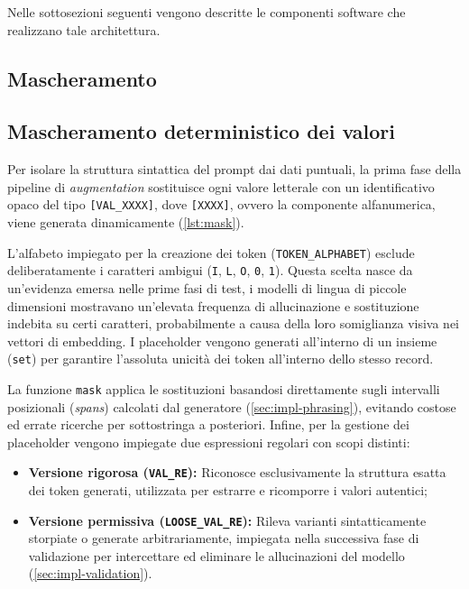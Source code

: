 \documentclass[12pt,a4paper,openright,twoside]{book}
\begin{document}
Nelle sottosezioni seguenti vengono descritte le componenti software che
realizzano tale architettura.

\subsection{Mascheramento}
\label{sec:impl-mask}

\subsection{Mascheramento deterministico dei valori}
\label{sec:impl-masking}

Per isolare la struttura sintattica del prompt dai dati puntuali, la prima fase
della pipeline di \textit{augmentation} sostituisce ogni valore letterale con un
identificativo opaco del tipo \texttt{[VAL\_XXXX]}, dove \texttt{[XXXX]}, ovvero
la componente alfanumerica, viene generata dinamicamente (\cref{lst:mask}).

L'alfabeto impiegato per la creazione dei token (\texttt{TOKEN\_ALPHABET})
esclude deliberatamente i caratteri ambigui (\texttt{I}, \texttt{L}, \texttt{O},
\texttt{0}, \texttt{1}). Questa scelta nasce da un'evidenza emersa nelle prime
fasi di test, i modelli di lingua di piccole dimensioni mostravano un'elevata
frequenza di allucinazione e sostituzione indebita su certi caratteri,
probabilmente a causa della loro somiglianza visiva nei vettori di embedding. I
placeholder vengono generati all'interno di un insieme (\texttt{set}) per
garantire l'assoluta unicità dei token all'interno dello stesso record.

La funzione \texttt{mask} applica le sostituzioni basandosi direttamente sugli
intervalli posizionali (\textit{spans}) calcolati dal generatore
(\cref{sec:impl-phrasing}), evitando costose ed errate ricerche per sottostringa
a posteriori. Infine, per la gestione dei placeholder vengono impiegate due
espressioni regolari con scopi distinti:
\begin{itemize}
    \item \textbf{Versione rigorosa (\texttt{VAL\_RE}):} Riconosce
          esclusivamente la struttura esatta dei token generati, utilizzata per
          estrarre e ricomporre i valori autentici;
    \item \textbf{Versione permissiva (\texttt{LOOSE\_VAL\_RE}):} Rileva
          varianti sintatticamente storpiate o generate arbitrariamente,
          impiegata nella successiva fase di validazione per intercettare ed
          eliminare le allucinazioni del modello (\cref{sec:impl-validation}).
\end{itemize}
\end{document}
